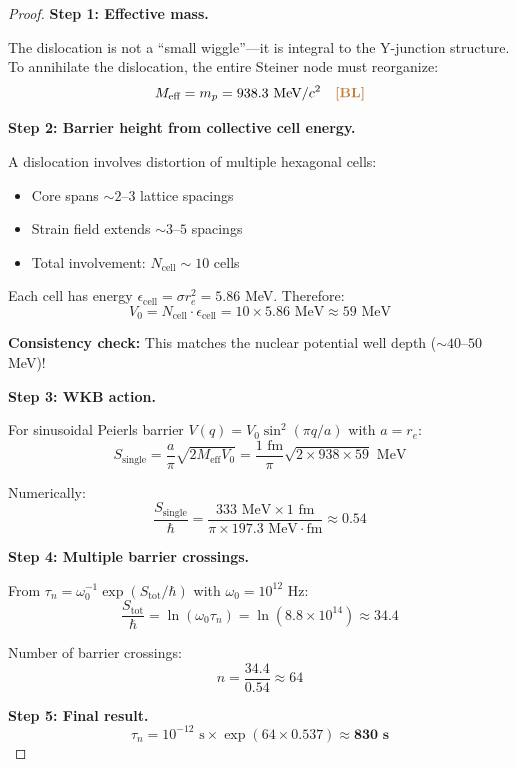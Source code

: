 \begin{proof}
\textbf{Step 1: Effective mass.}

The dislocation is not a ``small wiggle''---it is integral to the Y-junction structure.
To annihilate the dislocation, the entire Steiner node must reorganize:
\begin{equation}
M_{\text{eff}} = m_p = 938.3 \text{ MeV}/c^2 \quad \textcolor{brown}{\textbf{[BL]}}{}
\end{equation}

\textbf{Step 2: Barrier height from collective cell energy.}

A dislocation involves distortion of multiple hexagonal cells:
\begin{itemize}
  \item Core spans $\sim 2$--$3$ lattice spacings
  \item Strain field extends $\sim 3$--$5$ spacings
  \item Total involvement: $N_{\text{cell}} \sim 10$ cells
\end{itemize}

Each cell has energy $\epsilon_{\text{cell}} = \sigma r_e^2 = 5.86$ MeV. Therefore:
\begin{equation}
V_0 = N_{\text{cell}} \cdot \epsilon_{\text{cell}} = 10 \times 5.86 \text{ MeV} \approx 59 \text{ MeV}
\end{equation}

\textbf{Consistency check:} This matches the nuclear potential well depth ($\sim 40$--$50$ MeV)!

\textbf{Step 3: WKB action.}

For sinusoidal Peierls barrier $V(q) = V_0 \sin^2(\pi q/a)$ with $a = r_e$:
\begin{equation}
S_{\text{single}} = \frac{a}{\pi}\sqrt{2 M_{\text{eff}} V_0} = \frac{1 \text{ fm}}{\pi}\sqrt{2 \times 938 \times 59} \text{ MeV}
\end{equation}

Numerically:
\begin{equation}
\frac{S_{\text{single}}}{\hbar} = \frac{333 \text{ MeV} \times 1 \text{ fm}}{\pi \times 197.3 \text{ MeV}\cdot\text{fm}} \approx 0.54
\end{equation}

\textbf{Step 4: Multiple barrier crossings.}

From $\tau_n = \omega_0^{-1} \exp(S_{\text{tot}}/\hbar)$ with $\omega_0 = 10^{12}$ Hz:
\begin{equation}
\frac{S_{\text{tot}}}{\hbar} = \ln(\omega_0 \tau_n) = \ln(8.8 \times 10^{14}) \approx 34.4
\end{equation}

Number of barrier crossings:
\begin{equation}
n = \frac{34.4}{0.54} \approx 64
\end{equation}

\textbf{Step 5: Final result.}
\begin{equation}
\tau_n = 10^{-12} \text{ s} \times \exp(64 \times 0.537) \approx \mathbf{830 \text{ s}}
\end{equation}
\end{proof}

